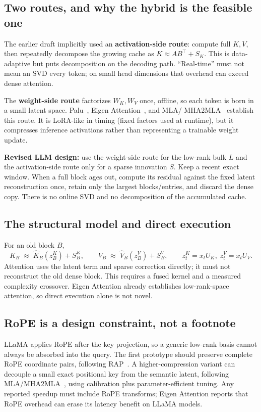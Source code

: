 \documentclass[11pt]{article}
\newcommand{\term}[1]{\textbf{\color{accent!85!black}#1}}
\begin{document}
\subsection{Two routes, and why the hybrid is the feasible one}
The earlier draft implicitly used an \term{activation-side route}: compute full $K,V$, then
repeatedly decompose the growing cache as $K\approx AB^\top+S_K$. This is data-adaptive but
puts decomposition on the decoding path. ``Real-time'' must not mean an SVD every token; on
small head dimensions that overhead can exceed dense attention.

The \term{weight-side route} factorizes $W_K,W_V$ once, offline, so each token is born in a
small latent space. Palu~\cite{palu}, Eigen Attention~\cite{eigenattn}, and MLA/
MHA2MLA~\cite{deepseekv2,mha2mla} establish this route. It is LoRA-like in timing (fixed
factors used at runtime), but it compresses inference activations rather than representing a
trainable weight update.

\begin{claimbox}
\textbf{Revised LLM design:} use the weight-side route for the low-rank bulk $L$ and the
activation-side route only for a sparse innovation $S$. Keep a recent exact window. When a
full block ages out, compute its residual against the fixed latent reconstruction once, retain
only the largest blocks/entries, and discard the dense copy. There is no online SVD and no
decomposition of the accumulated cache.
\end{claimbox}

\subsection{The structural model and direct execution}
For an old block $B$,
\[
K_B \;\approx\; \hat K_B(z_B^K)+S_B^K,\qquad
V_B \;\approx\; \hat V_B(z_B^V)+S_B^V,\qquad
z_t^K=x_tU_K,\;z_t^V=x_tU_V .
\]
Attention uses the latent term and sparse correction directly; it must not reconstruct the old
dense block. This requires a fused kernel and a measured complexity crossover. Eigen Attention
already establishes low-rank-space attention, so direct execution alone is not novel.

\subsection{RoPE is a design constraint, not a footnote}
LLaMA applies RoPE after the key projection, so a generic low-rank basis cannot always be
absorbed into the query. The first prototype should preserve complete RoPE coordinate pairs,
following RAP~\cite{rap}. A higher-compression variant can decouple a small exact positional
key from the semantic latent, following MLA/MHA2MLA~\cite{deepseekv2,mha2mla}, using
calibration plus parameter-efficient tuning. Any reported speedup must include RoPE transforms;
Eigen Attention reports that RoPE overhead can erase its latency benefit on LLaMA models.
\end{document}
